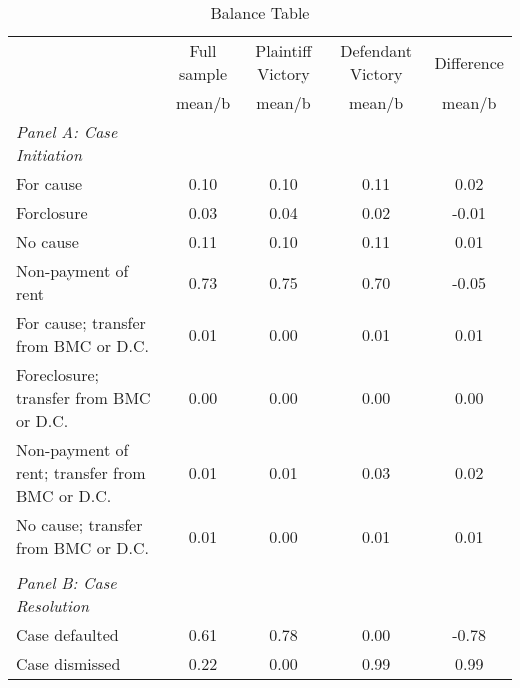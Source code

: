 \begin{table}[htbp]\centering
\def\sym#1{\ifmmode^{#1}\else\(^{#1}\)\fi}
\caption{Balance Table}
\begin{tabular}{l*{4}{c}}
\toprule
                    &\multicolumn{1}{c}{Full sample}&\multicolumn{1}{c}{Plaintiff Victory}&\multicolumn{1}{c}{Defendant Victory}&\multicolumn{1}{c}{Difference}\\
                    &      mean/b&      mean/b&      mean/b&      mean/b\\
\midrule
\emph{Panel A: Case Initiation}&            &            &            &            \\
\hspace{0.25cm}For cause&       0.10 &       0.10 &       0.11 &        0.02\\
\hspace{0.25cm}Forclosure&       0.03 &       0.04 &       0.02 &       -0.01\\
\hspace{0.25cm}No cause&       0.11 &       0.10 &       0.11 &        0.01\\
\hspace{0.25cm}Non-payment of rent&       0.73 &       0.75 &       0.70 &       -0.05\\
\hspace{0.25cm}For cause; transfer from BMC or D.C.&       0.01 &       0.00 &       0.01 &        0.01\\
\hspace{0.25cm}Foreclosure; transfer from BMC or D.C.&       0.00 &       0.00 &       0.00 &        0.00\\
\hspace{0.25cm}Non-payment of rent; transfer from BMC or D.C.&       0.01 &       0.01 &       0.03 &        0.02\\
\hspace{0.25cm}No cause; transfer from BMC or D.C.&       0.01 &       0.00 &       0.01 &        0.01\\
\vspace{0.1em} \\ \emph{Panel B: Case Resolution}&            &            &            &            \\
\hspace{0.25cm}Case defaulted&       0.61 &       0.78 &       0.00 &       -0.78\\
\hspace{0.25cm}Case dismissed&       0.22 &       0.00 &       0.99 &        0.99\\

\end{tabular}
\end{table}
